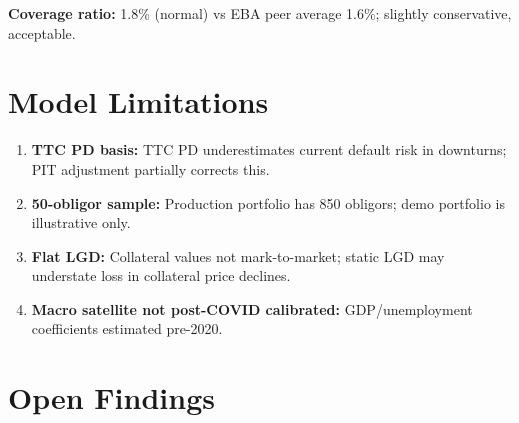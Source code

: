 \documentclass{apex_mdd}
\begin{document}
\textbf{Coverage ratio:} 1.8\% (normal) vs EBA peer average 1.6\%; slightly conservative, acceptable.

\section{Model Limitations}

\begin{enumerate}
  \item \textbf{TTC PD basis:} TTC PD underestimates current default risk in downturns; PIT adjustment partially corrects this.
  \item \textbf{50-obligor sample:} Production portfolio has 850 obligors; demo portfolio is illustrative only.
  \item \textbf{Flat LGD:} Collateral values not mark-to-market; static LGD may understate loss in collateral price declines.
  \item \textbf{Macro satellite not post-COVID calibrated:} GDP/unemployment coefficients estimated pre-2020.
\end{enumerate}

\section{Open Findings}

\begin{findings}
\end{findings}
\end{document}
